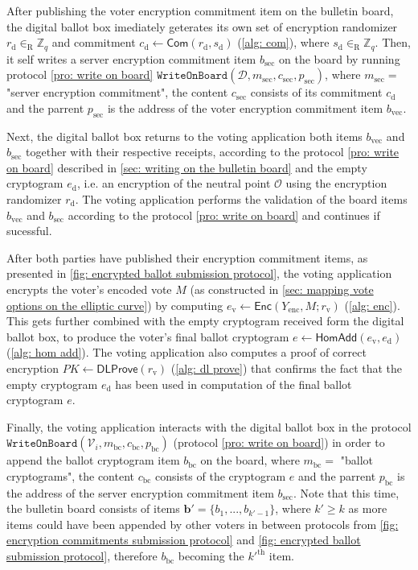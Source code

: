 After publishing the voter encryption commitment item on the bulletin board, the digital ballot box imediately geterates its own set of encryption randomizer $r_\mathrm{d} \in_\mathrm{R} \mathbb{Z}_q$ and commitment $c_\mathrm{d} \gets \mathsf{Com}(r_\mathrm{d}, s_\mathrm{d})$ (\cref{alg: com}), where $s_\mathrm{d} \in_\mathrm{R} \mathbb{Z}_q$. Then, it self writes a server encryption commitment item $b_\mathrm{sec}$ on the board by running protocol \ref{pro: write on board} $\mathtt{WriteOnBoard}(\mathcal{D}, m_\mathrm{sec}, c_\mathrm{sec}, p_\mathrm{sec})$, where $m_\mathrm{sec} =$ "server encryption commitment", the content $c_\mathrm{sec}$ consists of its commitment $c_\mathrm{d}$ and the parrent $p_\mathrm{sec}$ is the address of the voter encryption commitment item $b_\mathrm{vec}$.

Next, the digital ballot box returns to the voting application both items $b_\mathrm{vec}$ and $b_\mathrm{sec}$ together with their respective receipts, according to the protocol \ref{pro: write on board} described in \cref{sec: writing on the bulletin board} and the empty cryptogram $e_\mathrm{d}$, i.e. an encryption of the neutral point $\mathcal{O}$ using the encryption randomizer $r_\mathrm{d}$. The voting application performs the validation of the board items $b_\mathrm{vec}$ and $b_\mathrm{sec}$ according to the protocol \ref{pro: write on board} and continues if sucessful.

After both parties have published their encryption commitment items, as presented in \cref{fig: encrypted ballot submission protocol}, the voting application encrypts the voter's encoded vote $M$ (as constructed in \cref{sec: mapping vote options on the elliptic curve}) by computing $e_\mathrm{v} \gets \mathsf{Enc}(Y_\mathrm{enc}, M; r_\mathrm{v})$ (\cref{alg: enc}). This gets further combined with the empty cryptogram received form the digital ballot box, to produce the voter's final ballot cryptogram $e \gets \mathsf{HomAdd}(e_\mathrm{v}, e_\mathrm{d})$ (\cref{alg: hom add}). The voting application also computes a proof of correct encryption $PK \gets \mathsf{DLProve}(r_\mathrm{v})$ (\cref{alg: dl prove}) that confirms the fact that the empty cryptogram $e_\mathrm{d}$ has been used in computation of the final ballot cryptogram $e$.

Finally, the voting application interacts with the digital ballot box in the protocol $\mathtt{WriteOnBoard}(\mathcal{V}_i, m_\mathrm{bc}, c_\mathrm{bc}, p_\mathrm{bc})$ (protocol \ref{pro: write on board}) in order to append the ballot cryptogram item $b_\mathrm{bc}$ on the board, where $m_\mathrm{bc} =$ "ballot cryptograms", the content $c_\mathrm{bc}$ consists of the cryptogram $e$ and the parrent $p_\mathrm{bc}$ is the address of the server encryption commitment item $b_\mathrm{sec}$. Note that this time, the bulletin board consists of items $\boldsymbol{b'} = \{ b_1, ..., b_{k'-1} \}$, where $k' \geq k$ as more items could have been appended by other voters in between protocols from \cref{fig: encryption commitments submission protocol} and \cref{fig: encrypted ballot submission protocol}, therefore $b_\mathrm{bc}$ becoming the ${k'}^\mathrm{th}$ item.

